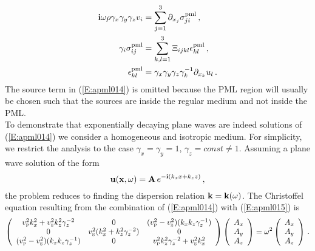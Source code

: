 \begin{subequations}\label{E:apml014}
\begin{align}
\mathbf{i}\omega \rho \gamma_x \gamma_y \gamma_z v_i &= \sum_{j=1}^{3}
\partial_{x_j} \sigma_{ji}^{\text{pml}}\,,\label{E:apml014a}\\
\gamma_i \sigma_{ij}^{\text{pml}} &= \sum_{k,l=1}^{3} \Xi_{ijkl}
\epsilon_{kl}^{\text{pml}}\,,\label{E:apml014b}\\
\epsilon_{kl}^{\text{pml}} &=  \gamma_x \gamma_y \gamma_z
\gamma_k^{-1} \partial_{x_k} u_l\,.\label{E:apml014c}
\end{align}
\end{subequations}
The source term in (\ref{E:apml014}) is omitted because the PML
region will usually be chosen such that the sources are inside the
regular medium and not inside the PML.\\[10pt]
To demonstrate that exponentially decaying plane waves are indeed
solutions of (\ref{E:apml014}) we consider a homogeneous and
isotropic medium. For simplicity, we restrict the analysis to the
case $\gamma_x=\gamma_y=1$, $\gamma_z = const \neq 1$. Assuming a
plane wave solution of the form
\begin{equation}\label{E:apml015}
\mathbf{u}(\mathbf{x},\omega)= \mathbf{A}\,e^{-\mathbf{i}(k_x x + k_z z ) }\,,
\end{equation}
the problem reduces to finding the dispersion relation
$\mathbf{k}=\mathbf{k}(\omega)$. The Christoffel equation resulting from the
combination of (\ref{E:apml014}) with (\ref{E:apml015}) is
\begin{equation}\label{E:apml016}
\left(
  \begin{array}{ccc}
    v_\text{\tiny{P}}^2 k_x^2 +v_\text{\tiny{S}}^2 k_z^2 \gamma_z^{-2} & 0 & (v_\text{\tiny{P}}^2-v_\text{\tiny{S}}^2)(k_x k_z \gamma_z^{-1}) \\
    0 & v_\text{\tiny{S}}^2 (k_x^2 + k_z^2 \gamma_z^{-2}) & 0 \\
    (v_\text{\tiny{P}}^2-v_\text{\tiny{S}}^2)(k_x k_z \gamma_z^{-1}) & 0 & v_\text{\tiny{P}}^2 k_z^2 \gamma_z^{-2} + v_\text{\tiny{S}}^2 k_x^2 \\
  \end{array}
\right) \left(
  \begin{array}{c}
    A_x \\
    A_y \\
    A_z \\
  \end{array}
\right)
 = \omega^2 \left(
                     \begin{array}{c}
                       A_x \\
                       A_y \\
                       A_z \\
                     \end{array}
                   \right)\,.
\end{equation}
